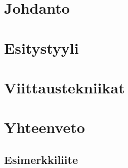 \documentclass[finnish, authoryear]{tauthesis}
\theoremstyle{definition}
\begin{document}


\glossary


\mainmatter

\chapter{Johdanto}
\label{ch:johdanto}


\chapter{Esitystyyli}
\label{ch:esitystyyli}


\chapter{Viittaustekniikat}
\label{ch:viittaustekniikat}



\chapter{Yhteenveto}
\label{ch:yhteenveto}



\printbibliography[heading=bibintoc]



\begin{appendices}

\chapter{Esimerkkiliite}
\label{ch:liite}


\end{appendices}
\end{document}
